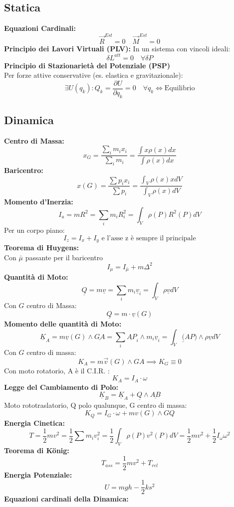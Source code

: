 \documentclass[a4paper]{report}
\begin{document}
\subsection*{Statica}
\textbf{Equazioni Cardinali: }
\[
\vec{R}^{Est}=0 \quad \vec{M}^{Est}=0      
\]
\textbf{Principio dei Lavori Virtuali (PLV):}
In un sistema con vincoli ideali:
\[
\delta L^{att} = 0 \quad \forall \delta P     
\]
\textbf{Principio di Stazionarietà del Potenziale (PSP)}\\
Per forze attive conservative (es. elastica e gravitazionale):
\[
\exists U(q_k): Q_k = \frac{\partial U}{\partial q_k} = 0 \quad \forall q_k \iff \text{Equilibrio}
\]

\subsection*{Dinamica}
\textbf{Centro di Massa: }
\[
    x_G=\frac{\sum_i m_i x_i}{\sum_i m_i}=\frac{\int x\rho (x) dx}{\int  \rho (x) dx}    
\]
\textbf{Baricentro:}
\[
x(G)=\frac{\sum p_i x_i}{\sum p_i} = \frac{\int_V \rho(x) x dV }{\int_V \rho(x) dV}
\]
\textbf{Momento d'Inerzia: }
\[
I_a = mR^2 = \sum_i m_i R_i^2 = \int_V \rho (P) R^2(P) dV    
\]
Per un corpo piano:
\[
    I_z = I_x + I_y \text{ e l'asse z è sempre il principale}    
\]
\textbf{Teorema di Huygens: }\\
Con $\bar{\mu}$ passante per il baricentro
\[
    I_\mu = I_{\bar{\mu}}+ m \Delta^2 
\]
\textbf{Quantità di Moto:} 
\[
\underline{Q} = m \underline{v} = \sum_i m_i \underline{v}_i = \int_V \rho \underline{v} dV    
\]
Con $G$ centro di Massa:
\[
\underline{Q} = m \cdot \underline{v}(G)    
\]
\textbf{Momento delle quantità di Moto:}
\[
\underline{K}_A = m \underline{v}(G) \wedge \underline{GA} = \sum_i \underline{AP}_i \wedge m_i\underline{v}_i = \int_V \underline(AP) \wedge\rho \underline{v} dV
\]
Con $G$ centro di massa:
\[
   K_A =  m \vec{v}(G) \wedge GA \implies K_G \equiv 0
\]
Con moto rotatorio, A è il C.I.R. :
\[
    K_A = I_A \cdot \omega 
\]
\textbf{Legge del Cambiamento di Polo:}
\[
    \underline{K}_B = \underline{K}_A + \underline{Q}\wedge\underline{AB }
\]
Moto rototraslatorio, Q polo qualunque, G centro di massa:
\[
   K_Q = I_G \cdot \omega + mv(G) \wedge GQ
\]
\textbf{Energia Cinetica:}
\[
T = \frac{1}{2} m v^2 = \frac{1}{2} \sum m_i v_i^2 = \frac{1}{2} \int _V \rho(P) v^2(P) dV = \frac{1}{2} m v^2 + \frac{1}{2} I_\omega \omega^2
\]
\textbf{Teorema di K\"onig:}
\[
T_{ass} = \frac{1}{2}mv^2 + T_{rel} 
\]
\textbf{Energia Potenziale:}
\[
U = mgh - \frac{1}{2} k s^2    
\]
\textbf{Equazioni cardinali della Dinamica:}
\end{document}
